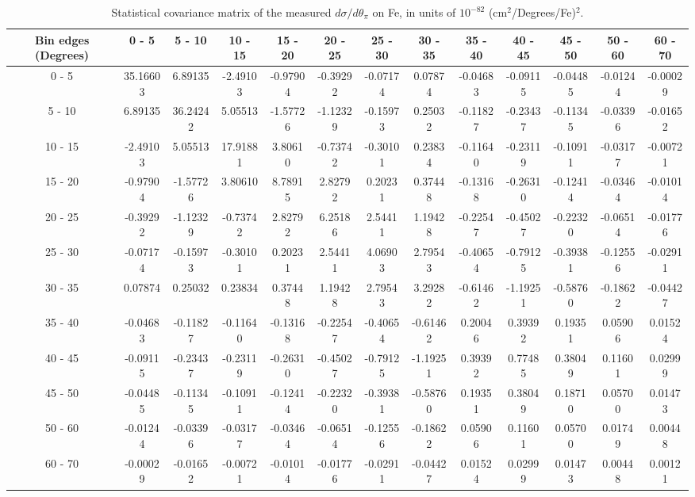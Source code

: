 \documentclass[aps,prl,twocolumn,superscriptaddress,nofootinbib]{revtex4-1}
\begin{document}
\begin{turnpage}
 \begin{table}[h!]
  \centering
  \caption{Statistical covariance matrix of the measured $d\sigma/d\theta_{\pi}$ on Fe, in units of $10^{-82}$ (cm$^{2}$/Degrees/Fe)$^{2}$.}
    \begin{tabular}{c||cccccccccccc}
      Bin edges (Degrees) & 0 - 5 & 5 - 10 & 10 - 15 & 15 - 20 & 20 - 25 & 25 - 30 & 30 - 35 & 35 - 40 & 40 - 45 & 45 - 50 & 50 - 60 & 60 - 70 \\
\hline \hline
        0 - 5 & 35.16603 &  6.89135 & -2.49103 & -0.97904 & -0.39292 & -0.07174 &  0.07874 & -0.04683 & -0.09115 & -0.04485 & -0.01244 & -0.00029 \\
       5 - 10 &  6.89135 & 36.24242 &  5.05513 & -1.57726 & -1.12329 & -0.15973 &  0.25032 & -0.11827 & -0.23437 & -0.11345 & -0.03396 & -0.01652 \\
      10 - 15 & -2.49103 &  5.05513 & 17.91881 &  3.80610 & -0.73742 & -0.30101 &  0.23834 & -0.11640 & -0.23119 & -0.10911 & -0.03177 & -0.00721 \\
      15 - 20 & -0.97904 & -1.57726 &  3.80610 &  8.78915 &  2.82792 &  0.20231 &  0.37448 & -0.13168 & -0.26310 & -0.12414 & -0.03464 & -0.01014 \\
      20 - 25 & -0.39292 & -1.12329 & -0.73742 &  2.82792 &  6.25186 &  2.54411 &  1.19428 & -0.22547 & -0.45027 & -0.22320 & -0.06514 & -0.01776 \\
      25 - 30 & -0.07174 & -0.15973 & -0.30101 &  0.20231 &  2.54411 &  4.06903 &  2.79543 & -0.40654 & -0.79125 & -0.39381 & -0.12556 & -0.02911 \\
      30 - 35 &  0.07874 &  0.25032 &  0.23834 &  0.37448 &  1.19428 &  2.79543 &  3.29282 & -0.61462 & -1.19251 & -0.58760 & -0.18622 & -0.04427 \\
      35 - 40 & -0.04683 & -0.11827 & -0.11640 & -0.13168 & -0.22547 & -0.40654 & -0.61462 &  0.20046 &  0.39392 &  0.19351 &  0.05906 &  0.01524 \\
      40 - 45 & -0.09115 & -0.23437 & -0.23119 & -0.26310 & -0.45027 & -0.79125 & -1.19251 &  0.39392 &  0.77485 &  0.38049 &  0.11601 &  0.02999 \\
      45 - 50 & -0.04485 & -0.11345 & -0.10911 & -0.12414 & -0.22320 & -0.39381 & -0.58760 &  0.19351 &  0.38049 &  0.18710 &  0.05700 &  0.01473 \\
      50 - 60 & -0.01244 & -0.03396 & -0.03177 & -0.03464 & -0.06514 & -0.12556 & -0.18622 &  0.05906 &  0.11601 &  0.05700 &  0.01749 &  0.00448 \\
      60 - 70 & -0.00029 & -0.01652 & -0.00721 & -0.01014 & -0.01776 & -0.02911 & -0.04427 &  0.01524 &  0.02999 &  0.01473 &  0.00448 &  0.00121 \\
    \end{tabular}
  \label{tablecov:Fe_Statistical_ThetaPi}
  \end{table}
\end{turnpage}
\end{document}
